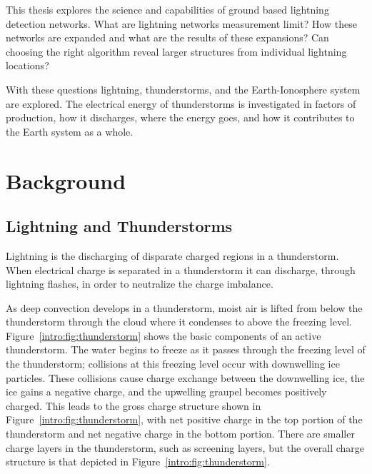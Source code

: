 This thesis explores the science and capabilities of ground based lightning detection networks.
What are lightning networks measurement limit?
How these networks are expanded and what are the results of these expansions?
Can choosing the right algorithm reveal larger structures from individual lightning locations?

With these questions lightning, thunderstorms, and the Earth-Ionosphere system are explored.
The electrical energy of thunderstorms is investigated in factors of production, how it discharges, where the energy goes, and how it contributes to the Earth system as a whole.

\section{Background}

\subsection{Lightning and Thunderstorms}

Lightning is the discharging of disparate charged regions in a thunderstorm.
When electrical charge is separated in a thunderstorm it can discharge, through lightning flashes, in order to neutralize the charge imbalance.

As deep convection develops in a thunderstorm, moist air is lifted from below the thunderstorm through the cloud where it condenses to above the freezing level.
Figure~\ref{intro:fig:thunderstorm} shows the basic components of an active thunderstorm.
The water begins to freeze as it passes through the freezing level of the thunderstorm; collisions at this freezing level occur with downwelling ice particles.
These collisions cause charge exchange between the downwelling ice, the ice gains a negative charge, and the upwelling graupel becomes positively charged.
This leads to the gross charge structure shown in Figure~\ref{intro:fig:thunderstorm}, with net positive charge in the top portion of the thunderstorm and net negative charge in the bottom portion.
There are smaller charge layers in the thunderstorm, such as screening layers, but the overall charge structure is that depicted in Figure~\ref{intro:fig:thunderstorm}.

